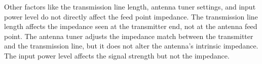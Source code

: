 Other factors like the transmission line length, antenna tuner settings, and input power level do not directly affect the feed point impedance. The transmission line length affects the impedance seen at the transmitter end, not at the antenna feed point. The antenna tuner adjusts the impedance match between the transmitter and the transmission line, but it does not alter the antenna's intrinsic impedance. The input power level affects the signal strength but not the impedance.


